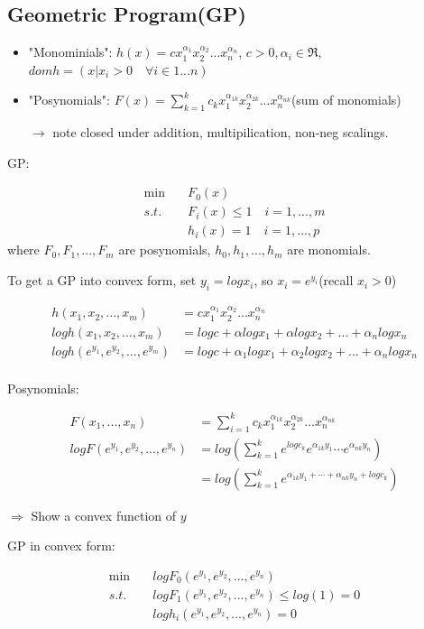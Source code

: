 \subsection{Geometric Program(GP)}

\begin{itemize}
	\item "Monominials": $h(x) = cx_1^{\alpha_1}x_2^{\alpha_2}...x_n^{\alpha_n}$, $c>0, \alpha_i\in \Re$, $domh = (x\vert x_i>0 \quad \forall i\in {1...n})$
	
	\item "Posynomials": $F(x) = \sum^k_{k=1}c_kx_1^{\alpha_{1k}}x_2^{\alpha_{2k}}...x_n^{\alpha_{nk}}$(sum of monomials)
	
	$\rightarrow$ note closed under addition, multipilication, non-neg scalings.
\end{itemize}
GP: 

\begin{align*}
\min\quad &F_0(x)\\
s.t. \quad&F_i(x)\leq 1\quad i = 1,...,m\\
&h_i(x)= 1\quad i = 1,...,p
\end{align*}
where $F_0, F_1,...,F_m$ are posynomials, $h_0, h_1,...,h_m$ are monomials.

To get a GP into convex form, set $y_i = log x_i$, so $x_i = e^{y_i}$(recall $x_i > 0$)

\begin{align*}
h(x_1,x_2,...,x_m) &= cx_1^{\alpha_1}x_2^{\alpha_2}...x_n^{\alpha_n}\\
log h(x_1,x_2,...,x_m) &= logc + \alpha log x_1 +\alpha log x_2 + ... + \alpha_n log x_n\\
log h(e^{y_1},e^{y_2},...,e^{y_m}) &= logc + \alpha_1 log x_1 +\alpha_2 log x_2 + ... + \alpha_n log x_n\\
\end{align*}

Posynomials:

\begin{align*}
F(x_1,...,x_n) &= \sum^k_{i=1}c_kx_1^{\alpha_{1k}}x_2^{\alpha_{2k}}...x_n^{\alpha_{nk}}\\
log F(e^{y_1},e^{y_2},...,e^{y_n}) &= log(\sum^k_{k=1}e^{logc_k}e^{\alpha_{1k}y_1}\cdots e^{\alpha_{nk}y_n})\\
&=log(\sum^k_{k=1}e^{\alpha_{1k}y_1+\cdots+\alpha_{nk}y_n+logc_k})
\end{align*}

$\Rightarrow$ Show a convex function of $y$

GP in convex form:

\begin{align*}
\min\quad & logF_0(e^{y_1},e^{y_2},...,e^{y_n}) \\
s.t. \quad& logF_1(e^{y_1},e^{y_2},...,e^{y_n}) \leq log(1) = 0\\
&log h_i(e^{y_1},e^{y_2},...,e^{y_n}) = 0
\end{align*}




